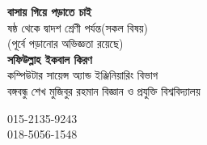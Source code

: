 \documentclass[6pt, serif]{beamer}
\begin{document}
\frame
{
\begin{center}
	{\Huge \textbf{বাসায় গিয়ে পড়াতে চাই}}\\
	\vspace{12pt}
	ষষ্ঠ থেকে দ্বাদশ শ্রেণী পর্যন্ত\hspace{4 pt}(সকল বিষয়)\\
	(পূর্বে পড়ানোর অভিজ্ঞতা রয়েছে)\\
	\vspace{8 pt}
	\textbf{{\Large সফিউল্লাহ ইকবাল কিরণ}}\\
	{\small কম্পিউটার সায়েন্স অ্যান্ড ইঞ্জিনিয়ারিং বিভাগ \\ বঙ্গবন্ধু শেখ মুজিবুর রহমান বিজ্ঞান ও প্রযুক্তি বিশ্ববিদ্যালয়}\\
	\vspace{3 pt}
	\begin{tcolorbox}[title=যোগাযোগ, width=110pt]
		\faPhoneSquare \hspace{2 pt} 015-2135-9243 \\
		\faPhoneSquare \hspace{2 pt} 018-5056-1548
	\end{tcolorbox}
\end{center}
}
\end{document}
